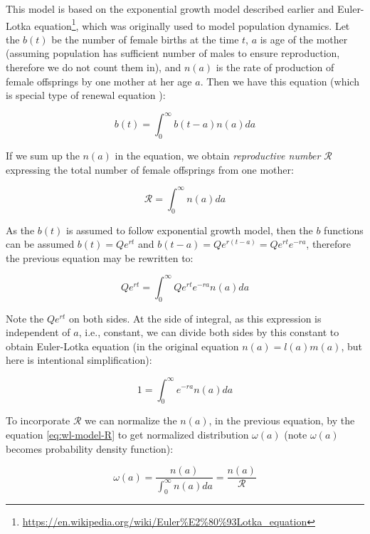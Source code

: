 \documentclass[
  digital, %
  oneside, %
  lof,     %
  lot,     %
]{fithesis4}
\begin{document}
This model is based on the exponential growth model described earlier and
Euler-Lotka equation\footnote{\url{https://en.wikipedia.org/wiki/Euler\%E2\%80\%93Lotka_equation}},
which was originally used to model population dynamics.
Let the $b(t)$ be the number of female births at the time $t$, $a$ is 
age of the mother (assuming population has sufficient 
number of males to ensure reproduction, therefore we do not 
count them in), and $n(a)$ is the rate of production of female offsprings 
by one mother at her age $a$. Then we have this equation (which is 
special type of renewal equation \cite{feller1941}):

\begin{equation}\label{eq:wl-model-renewal}
  b(t) = \int_{0}^{\infty} b(t - a) n(a) da
\end{equation}

If we sum up the $n(a)$ in the equation, we obtain \textit{reproductive number} 
$\mathcal{R}$ expressing the total number of female offsprings from one mother:

\begin{equation}\label{eq:wl-model-R}
  \mathcal{R} = \int_0^{\infty} n(a) da
\end{equation}

As the $b(t)$ is assumed to follow exponential growth model, then 
the $b$ functions can be assumed $b(t) = Q e^{rt}$ and 
$b(t - a) = Q e^{r(t - a)} = Q e^{rt} e^{-ra}$, therefore the
previous equation may be rewritten to:

\begin{equation}
  Q e^{rt} = \int_{0}^{\infty} Q e^{rt} e^{-ra} n(a) da
\end{equation}

Note the $Q e^{rt}$ on both sides. At the side of integral, 
as this expression is independent of $a$, i.e., constant, we can 
divide both sides by this constant to obtain Euler-Lotka
equation (in the original equation $n(a) = l(a) m(a)$, but 
here is intentional simplification):

\begin{equation}\label{eq:wl-model-euler-lotka}
  1 = \int_{0}^{\infty} e^{-ra} n(a) da
\end{equation}

To incorporate $\mathcal{R}$ we can normalize the $n(a)$, in the
previous equation, by the equation \eqref{eq:wl-model-R} to get
normalized distribution $\omega(a)$ (note $\omega(a)$ becomes 
probability density function):

\begin{equation}
  \omega(a) = \frac{n(a)}{\int_0^{\infty} n(a) da} = \frac{n(a)}{\mathcal{R}}
\end{equation}
\end{document}
